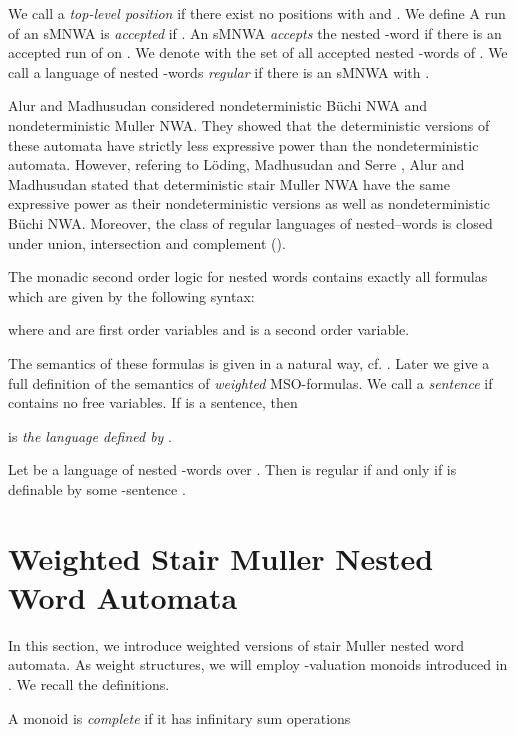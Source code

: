 \documentclass[runningheads, envcountsame, a4paper]{llncs}
\begin{document}
	 We call  a \emph{top-level position} if there exist no positions  with  and . 
We define  A run  of an sMNWA is \emph{accepted} if .
An sMNWA  \emph{accepts} the nested -word  if there is an accepted run of  on . We denote with  the set of all accepted nested -words of . We call a language  of nested -words \emph{regular} if there is an sMNWA  with .
\par
Alur and Madhusudan \cite{AM} considered nondeterministic B\"uchi NWA and nondeterministic Muller NWA. They showed that the deterministic versions of these automata have strictly less expressive power than the nondeterministic automata. However, refering to L\"oding, Madhusudan and Serre \cite{LMS}, Alur and Madhusudan stated that deterministic stair Muller NWA have the same expressive power as their nondeterministic versions as well as nondeterministic B\"uchi NWA.
Moreover, the class of regular languages of nested--words is closed under union, intersection and complement (\cite{AM}).
\begin{Def}
	 The monadic second order logic for nested words  contains exactly all formulas  which are given by the following syntax:
	
where  and  are first order variables and  
is a second order variable.
\end{Def}
The semantics of these formulas is given in a natural way, cf. \cite{AM}. Later we give a full definition of the semantics of \emph{weighted} MSO-formulas. 
We call  a \emph{sentence} if  contains no free variables. If  is a sentence, then

is \emph{the language defined by} .
\begin{Theorem} \label{regMSOD} Let  be a language of nested -words over . Then  is regular if and only if  is definable by some -sentence . 
\end{Theorem}
\section{Weighted Stair Muller Nested Word Automata} \label{kapomega} In this section, we introduce weighted versions of stair Muller nested word automata. As weight structures, we will employ -valuation monoids introduced in \cite{DM}. We recall the definitions.
\par
A monoid  is \emph{complete} if it has infinitary sum operations
	
\end{document}
